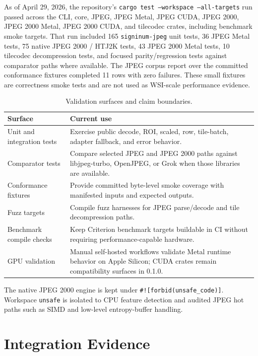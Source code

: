 \documentclass[11pt]{article}
\newcommand{\crate}[1]{\texttt{#1}}
\begin{document}
As of April 29, 2026, the repository's \texttt{cargo test --workspace
--all-targets} run passed across the CLI, core, JPEG, JPEG Metal, JPEG CUDA,
JPEG 2000, JPEG 2000 Metal, JPEG 2000 CUDA, and tilecodec crates, including
benchmark smoke targets. That run included 165 \crate{signinum-jpeg} unit tests,
36 JPEG Metal tests, 75 native JPEG 2000 / HTJ2K tests, 43 JPEG 2000 Metal
tests, 10 tilecodec decompression tests, and focused parity/regression tests
against comparator paths where available. The JPEG corpus report over the
committed conformance fixtures completed 11 rows with zero failures. These
small fixtures are correctness smoke tests and are not used as WSI-scale
performance evidence.

\begin{table}[t]
\centering
\caption{Validation surfaces and claim boundaries.}
\label{tab:validation}
\begin{tabularx}{\linewidth}{@{}lY@{}}
\toprule
Surface & Current use \\
\midrule
Unit and integration tests & Exercise public decode, ROI, scaled, row,
tile-batch, adapter fallback, and error behavior. \\
Comparator tests & Compare selected JPEG and JPEG 2000 paths against
libjpeg-turbo, OpenJPEG, or Grok when those libraries are available. \\
Conformance fixtures & Provide committed byte-level smoke coverage with
manifested inputs and expected outputs. \\
Fuzz targets & Compile fuzz harnesses for JPEG parse/decode and tile
decompression paths. \\
Benchmark compile checks & Keep Criterion benchmark targets buildable in CI
without requiring performance-capable hardware. \\
GPU validation & Manual self-hosted workflows validate Metal runtime behavior
on Apple Silicon; CUDA crates remain compatibility surfaces in 0.1.0. \\
\bottomrule
\end{tabularx}
\end{table}

The native JPEG 2000 engine is kept under \texttt{\#![forbid(unsafe\_code)]}.
Workspace \texttt{unsafe} is isolated to CPU feature detection and audited JPEG
hot paths such as SIMD and low-level entropy-buffer handling.

\section{Integration Evidence}
\end{document}
